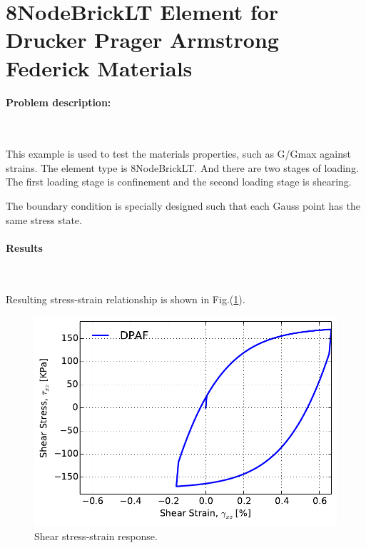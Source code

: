 \section{8NodeBrickLT Element for Drucker Prager Armstrong Federick Materials }

\paragraph{Problem description:} ~

This example is used to test the materials properties, such as G/Gmax against strains. The element type is 8NodeBrickLT. And there are two stages of loading. The first loading stage is confinement and the second loading stage is shearing. 

The boundary condition is specially designed such that each Gauss point has the same stress state. 





\paragraph{Results} ~

Resulting stress-strain relationship is shown in Fig.(\ref{fig_8nodebrick_result}). 

\begin{figure}[!htb]
  \centering
  \includegraphics[width=12cm]{./Figure-files/_Chapter_Appendix_Illustrative_Examples/drucker_prager_armstrong_federick.pdf}
  \caption{Shear stress-strain response.}
  \label{fig_8nodebrick_result}
\end{figure}

